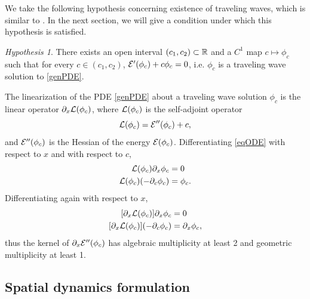 \documentclass[12pt]{elsarticle}
\theoremstyle{plain}
\theoremstyle{definition}
\theoremstyle{remark}
\newtheorem{hypothesis}[theorem]{Hypothesis}
\numberwithin{theorem}{section}
\numberwithin{equation}{section}
\begin{document}
We take the following hypothesis concerning existence of traveling waves, which is similar to \cite[Assumption 2]{Grillakis1987}. In the next section, we will give a condition under which this hypothesis is satisfied. 
\begin{hypothesis}\label{hyp:cinterval}
There exists an open interval $(c_1, c_2) \subset \mathbb{R}$ and a $C^1$ map $c \mapsto \phi_c$ such that for every $c \in (c_1, c_2)$, $\mathcal{E}'(\phi_c) + c \phi_c = 0$, i.e. $\phi_c$ is a traveling wave solution to \cref{genPDE}.
\end{hypothesis}

\noi The linearization of the PDE \cref{genPDE} about a traveling wave solution $\phi_c$ is the linear operator $\partial_x \mathcal{L}(\phi_c)$, where $\mathcal{L}(\phi_c)$ is the self-adjoint operator
\begin{equation}\label{PDElinearization}
\mathcal{L}(\phi_c) = \mathcal{E}''(\phi_c) + c,
\end{equation}
and $\mathcal{E}''(\phi_c)$ is the Hessian of the energy $\mathcal{E}(\phi_c)$. Differentiating \cref{eqODE} with respect to $x$ and with respect to $c$,
\begin{equation}\label{Lkernel}
\begin{aligned}
\mathcal{L}(\phi_c) \partial_x \phi_c &= 0 \\
\mathcal{L}(\phi_c) (-\partial_c \phi_c)& = \phi_c.
\end{aligned}
\end{equation}
Differentiating again with respect to $x$,
\begin{equation}\label{Ekernel}
\begin{aligned}
[\partial_x \calL(\phi_c)] \partial_x \phi_c &= 0 \\
[\partial_x \calL(\phi_c)](-\partial_c \phi_c) &= \partial_x \phi_c,
\end{aligned}
\end{equation}
thus the kernel of $\partial_x \mathcal{E}''(\phi_c)$ has algebraic multiplicity at least 2 and geometric multiplicity at least 1.

\subsection{Spatial dynamics formulation}\label{sec:spatdym}
\end{document}
